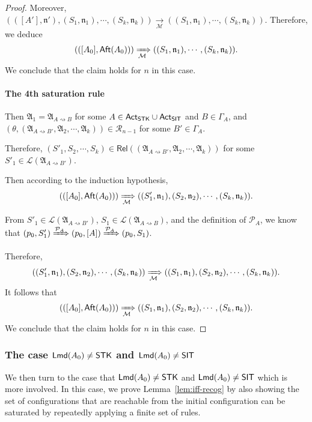 \documentclass[preprint,12pt]{elsarticle}
\newcommand\Mm{{\mathcal{M} }}
\newcommand\Pp{{\mathcal{P} }}
\newcommand\act{{\sf Act}}
\newcommand\aft{{\sf Aft}}
\newcommand\lmd{{\sf Lmd}}
\newcommand\singletask{{\sf STK}}
\newcommand\singleinstance{{\sf SIT}}
\newcommand\post{{\mathsf{post} }}
\newcommand\aname{\mathfrak{n}}
\newcommand\AutReach{\mathscr{R}}
\newcommand\Rel{\mathsf{Rel}}
\newcommand{\STK}{\mathsf{STK}}
\newcommand{\SIT}{\mathsf{SIT}}
\newcommand\Aut{{\mathfrak{A} }}
\newcommand\Lang{{\mathscr{L} }}
\begin{document}
\begin{proof}
Moreover, $(([A'], \aname'), (S_1, \aname_1), \cdots, (S_k, \aname_k)) \xrightarrow[\Mm]{} ((S_1, \aname_1), \cdots, (S_k, \aname_k))$. Therefore, we deduce 
$$(([A_0], \aft(A_0))) \xRightarrow[\Mm]{} ((S_1, \aname_1), \cdots, (S_k, \aname_k)).$$ 
We conclude that the claim holds for $n$ in this case. 

\paragraph*{The 4th saturation rule} Then $\Aut_1 = \Aut_{A\rightsquigarrow B}$ for some $A \in \act_\singletask \cup \act_\singleinstance$ and $B \in \Gamma_A$,  and $(\theta, (\Aut_{A\rightsquigarrow B'}, \Aut_2, \cdots, \Aut_k)) \in \AutReach_{n-1}$ for  some $B' \in \Gamma_A$. 

Therefore, $(S'_1, S_2, \cdots, S_k) \in \Rel((\Aut_{A\rightsquigarrow B'}, \Aut_2, \cdots, \Aut_k))$ for some $S'_1 \in \Lang(\Aut_{A\rightsquigarrow B'})$. 

Then according to the induction hypothesis, 
$$(([A_0], \aft(A_0))) \xRightarrow[\Mm]{} ((S'_1, \aname_1), (S_2, \aname_2), \cdots, (S_k, \aname_k)).$$

From $S'_1 \in \Lang(\Aut_{A\rightsquigarrow B'})$, $S_1 \in \Lang(\Aut_{A\rightsquigarrow B})$, and the definition of $\Pp_A$, we know that $(p_0, S'_1) \xRightarrow{\Pp_A} (p_0, [A]) \xRightarrow{\Pp_A} (p_0, S_1)$. 

Therefore, 
$$((S'_1, \aname_1), (S_2, \aname_2), \cdots, (S_k, \aname_k)) \xRightarrow[\Mm]{} ((S_1, \aname_1), (S_2, \aname_2), \cdots, (S_k, \aname_k)).$$
It follows that 
$$(([A_0], \aft(A_0))) \xRightarrow[\Mm]{} ((S_1, \aname_1), (S_2, \aname_2), \cdots, (S_k, \aname_k)).$$
We conclude that the claim holds for $n$ in this case. 
\end{proof}



\subsubsection{The case $\lmd(A_0) \neq \STK$ and $\lmd(A_0) \neq \SIT$}\label{sec:lmamass-nostk}
%
We then turn to the case that $\lmd(A_0)\neq\STK$ and  $\lmd(A_0) \neq \SIT$ which is more involved. In this case, we prove Lemma~\ref{lem:iff-recog} by also showing the set of configurations that are reachable from the initial configuration can be saturated by repeatedly applying a finite set of rules.
\end{document}
